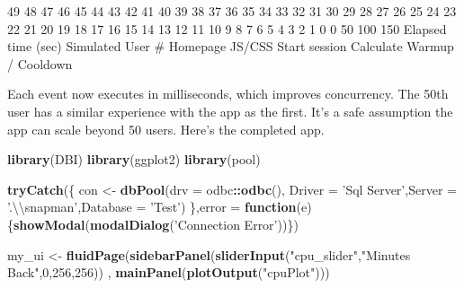 \documentclass[]{article}
\newenvironment{Shaded}{\begin{snugshade}}{\end{snugshade}}
\newcommand{\CharTok}[1]{\textcolor[rgb]{0.31,0.60,0.02}{#1}}
\newcommand{\ControlFlowTok}[1]{\textcolor[rgb]{0.13,0.29,0.53}{\textbf{#1}}}
\newcommand{\DataTypeTok}[1]{\textcolor[rgb]{0.13,0.29,0.53}{#1}}
\newcommand{\DecValTok}[1]{\textcolor[rgb]{0.00,0.00,0.81}{#1}}
\newcommand{\KeywordTok}[1]{\textcolor[rgb]{0.13,0.29,0.53}{\textbf{#1}}}
\newcommand{\NormalTok}[1]{#1}
\newcommand{\OperatorTok}[1]{\textcolor[rgb]{0.81,0.36,0.00}{\textbf{#1}}}
\newcommand{\StringTok}[1]{\textcolor[rgb]{0.31,0.60,0.02}{#1}}
\begin{document}
49 48 47 46 45 44 43 42 41 40 39 38 37 36 35 34 33 32 31 30 29 28 27 26
25 24 23 22 21 20 19 18 17 16 15 14 13 12 11 10 9 8 7 6 5 4 3 2 1 0 0 50
100 150 Elapsed time (sec) Simulated User \# Homepage JS/CSS Start
session Calculate Warmup / Cooldown

Each event now executes in milliseconds, which improves concurrency. The
50th user has a similar experience with the app as the first. It's a
safe assumption the app can scale beyond 50 users. Here's the completed
app.

\begin{Shaded}
\begin{Highlighting}[]
\KeywordTok{library}\NormalTok{(DBI)}
\KeywordTok{library}\NormalTok{(ggplot2)}
\KeywordTok{library}\NormalTok{(pool)}

\KeywordTok{tryCatch}\NormalTok{(\{}
\NormalTok{con <-}\StringTok{  }\KeywordTok{dbPool}\NormalTok{(}\DataTypeTok{drv =}\NormalTok{ odbc}\OperatorTok{::}\KeywordTok{odbc}\NormalTok{(),}
               \DataTypeTok{Driver =} \StringTok{'Sql Server'}\NormalTok{,}\DataTypeTok{Server =} \StringTok{'.}\CharTok{\textbackslash{}\textbackslash{}}\StringTok{snapman'}\NormalTok{,}\DataTypeTok{Database =} \StringTok{'Test'}\NormalTok{)}
\NormalTok{\},}\DataTypeTok{error =} \ControlFlowTok{function}\NormalTok{(e)\{}\KeywordTok{showModal}\NormalTok{(}\KeywordTok{modalDialog}\NormalTok{(}\StringTok{'Connection Error'}\NormalTok{))\})}

\NormalTok{my_ui <-}\StringTok{ }\KeywordTok{fluidPage}\NormalTok{(}\KeywordTok{sidebarPanel}\NormalTok{(}\KeywordTok{sliderInput}\NormalTok{(}\StringTok{"cpu_slider"}\NormalTok{,}\StringTok{"Minutes Back"}\NormalTok{,}\DecValTok{0}\NormalTok{,}\DecValTok{256}\NormalTok{,}\DecValTok{256}\NormalTok{))}
\NormalTok{                   , }\KeywordTok{mainPanel}\NormalTok{(}\KeywordTok{plotOutput}\NormalTok{(}\StringTok{"cpuPlot"}\NormalTok{)))}


\end{Highlighting}
\end{Shaded}
\end{document}

